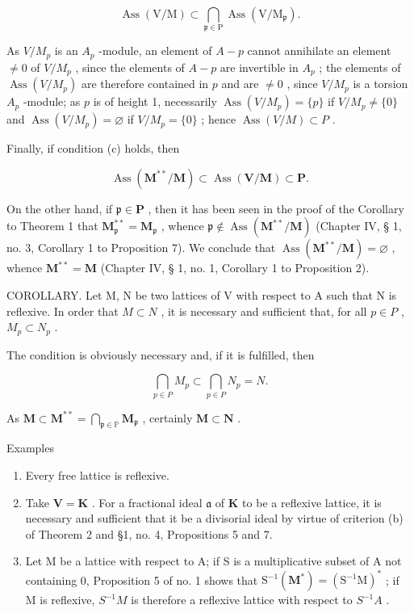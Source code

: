 \[
\operatorname{Ass} (\mathrm{V} / \mathrm{M}) \subset \bigcap_ {\mathfrak {p} \in \mathrm{P}} \operatorname{Ass} (\mathrm{V} / \mathrm{M} _ {\mathfrak {p}}).
\]

As \(V / M_{p}\) is an \(A_{p}\) -module, an element of \(A - p\) cannot annihilate an element \(\neq 0\) of \(V / M_{p}\) , since the elements of \(A - p\) are invertible in \(A_{p}\) ; the elements of \(\operatorname{Ass}(V / M_{p})\) are therefore contained in \(p\) and are \(\neq 0\) , since \(V / M_{p}\) is a torsion \(A_{p}\) -module; as \(p\) is of height 1, necessarily \(\operatorname{Ass}(V / M_{p}) = \{p\}\) if \(V / M_{p} \neq \{0\}\) and \(\operatorname{Ass}(V / M_{p}) = \varnothing\) if \(V / M_{p} = \{0\}\) ; hence \(\operatorname{Ass}(V / M) \subset P\) .

Finally, if condition (c) holds, then

\[
\operatorname{Ass} (\mathbf {M} ^ {* *} / \mathbf {M}) \subset \operatorname{Ass} (\mathbf {V} / \mathbf {M}) \subset \mathbf {P}.
\]

On the other hand, if \(\mathfrak{p} \in \mathbf{P}\) , then it has been seen in the proof of the Corollary to Theorem 1 that \(\mathbf{M}_{\mathfrak{p}}^{**} = \mathbf{M}_{\mathfrak{p}}\) , whence \(\mathfrak{p} \notin \operatorname{Ass}(\mathbf{M}^{**}/\mathbf{M})\) (Chapter IV, § 1, no. 3, Corollary 1 to Proposition 7). We conclude that \(\operatorname{Ass}(\mathbf{M}^{**}/\mathbf{M}) = \varnothing\) , whence \(\mathbf{M}^{**} = \mathbf{M}\) (Chapter IV, § 1, no. 1, Corollary 1 to Proposition 2).

COROLLARY. Let M, N be two lattices of V with respect to A such that N is reflexive. In order that \(M \subset N\) , it is necessary and sufficient that, for all \(p \in P\) , \(M_{p} \subset N_{p}\) .

The condition is obviously necessary and, if it is fulfilled, then

\[
\bigcap_ {p \in P} M _ {p} \subset \bigcap_ {p \in P} N _ {p} = N.
\]

As \(\mathbf{M} \subset \mathbf{M}^{**} = \bigcap_{\mathfrak{p} \in \mathbb{P}} \mathbf{M}_{\mathfrak{p}}\) , certainly \(\mathbf{M} \subset \mathbf{N}\) .

Examples

\begin{enumerate}
\def\labelenumi{(\arabic{enumi})}
\item
  Every free lattice is reflexive.
\item
  Take \(\mathbf{V} = \mathbf{K}\) . For a fractional ideal \(\mathfrak{a}\) of \(\mathbf{K}\) to be a reflexive lattice, it is necessary and sufficient that it be a divisorial ideal by virtue of criterion (b) of Theorem 2 and §1, no. 4, Propositions 5 and 7.
\item
  Let M be a lattice with respect to A; if S is a multiplicative subset of A not containing 0, Proposition 5 of no. 1 shows that \(\mathrm{S}^{-1}(\mathbf{M}^{*}) = (\mathrm{S}^{-1}\mathrm{M})^{*}\) ; if M is reflexive, \(S^{-1}M\) is therefore a reflexive lattice with respect to \(S^{-1}A\) .
\end{enumerate}

